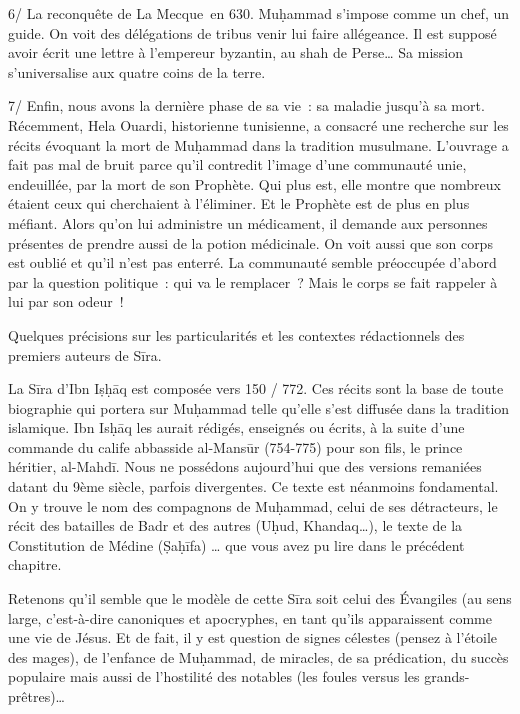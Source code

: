 6/ La reconquête de La Mecque~en 630. Muḥammad s'impose comme un chef,
un guide. On voit des délégations de tribus venir lui faire allégeance.
Il est supposé avoir écrit une lettre à l'empereur byzantin, au shah de
Perse\ldots{} Sa mission s'universalise aux quatre coins de la terre.

7/ Enfin, nous avons la dernière phase de sa vie~: sa maladie jusqu'à sa
mort. Récemment, Hela Ouardi, historienne tunisienne, a consacré une
recherche sur les récits évoquant la mort de Muḥammad dans la tradition
musulmane. L'ouvrage a fait pas mal de bruit parce qu'il contredit
l'image d'une communauté unie, endeuillée, par la mort de son
Prophète. Qui plus est, elle montre que nombreux étaient
ceux qui cherchaient à l'éliminer. Et le Prophète est de plus en plus
méfiant. Alors qu'on lui administre un médicament, il demande aux
personnes présentes de prendre aussi de la potion médicinale. On voit
aussi que son corps est oublié et qu'il n'est pas enterré. La communauté
semble préoccupée d'abord par la question politique~: qui va le
remplacer~? Mais le corps se fait rappeler à lui par son odeur~!

Quelques précisions sur les particularités et les contextes
rédactionnels des premiers auteurs de Sīra.


La Sīra d'Ibn Iṣḥāq est composée vers 150 / 772. Ces récits sont la base
de toute biographie qui portera sur Muḥammad telle qu'elle s'est
diffusée dans la tradition islamique. Ibn Isḥāq les aurait rédigés,
enseignés ou écrits, à la suite d'une commande du calife abbasside
al-Mansūr (754-775) pour son fils, le prince héritier, al-Mahdī. Nous ne
possédons aujourd'hui que des versions remaniées datant du 9ème siècle,
parfois divergentes. Ce texte est néanmoins fondamental. On y trouve le
nom des compagnons de Muḥammad, celui de ses détracteurs, le récit des
batailles de Badr et des autres (Uḥud, Khandaq\ldots), le texte de la
Constitution de Médine (Ṣaḥīfa) \ldots{} que vous avez pu lire dans le
précédent chapitre.

Retenons qu'il semble que le modèle de cette Sīra soit celui des
Évangiles (au sens large, c'est-à-dire canoniques et apocryphes, en tant
qu'ils apparaissent comme une vie de Jésus. Et de fait, il y est
question de signes célestes (pensez à l'étoile des mages), de l'enfance
de Muḥammad, de miracles, de sa prédication, du succès populaire mais
aussi de l'hostilité des notables (les foules versus les
grands-prêtres)\ldots{}

